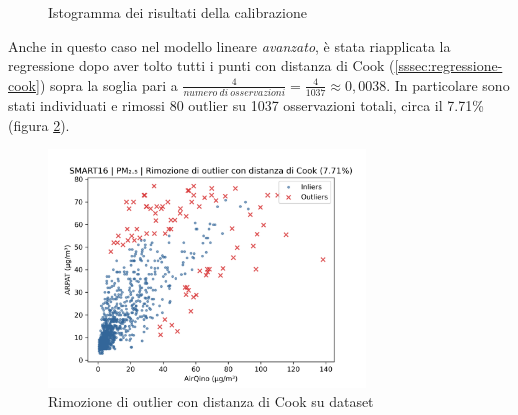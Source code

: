 \begin{figure}[H]%
    \centering
    \captionsetup{justification=centering}
    \caption{Istogramma dei risultati della calibrazione }%
    \label{fig:risultati-pm2.5-hist}%
\end{figure}

Anche in questo caso nel modello lineare \textit{avanzato}, è stata riapplicata la regressione dopo aver tolto tutti i punti con distanza di Cook (\ref{sssec:regressione-cook}) sopra la soglia pari a $\frac{4}{numero\ di\ osservazioni} = \frac{4}{1037} \approx 0,0038$. In particolare sono stati individuati e rimossi 80 outlier su 1037 osservazioni totali, circa il 7.71\% (figura \ref{fig:cook-pm2.5}).

\begin{figure}[H]
\centering
\includegraphics[width=0.75\textwidth,height=\textheight,keepaspectratio]{img/cook_pm2.5.png}
\caption{Rimozione di outlier con distanza di Cook su dataset }%
\label{fig:cook-pm2.5}%
\end{figure}

